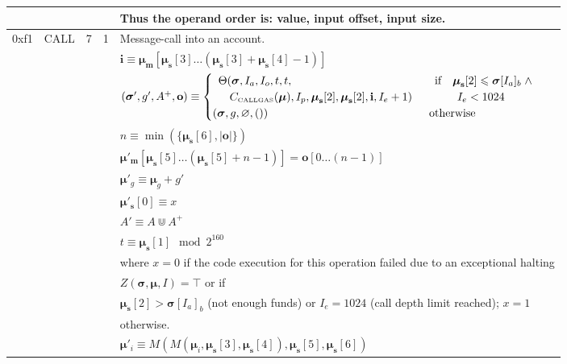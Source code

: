 \documentclass[9pt,oneside]{amsart}
\begin{document}
\begin{tabular*}{\columnwidth}[h]{rlrrl}
&&&& Thus the operand order is: value, input offset, input size. \\
\midrule
0xf1 & {\small CALL} & 7 & 1 & Message-call into an account. \\
&&&& $\mathbf{i} \equiv \boldsymbol{\mu}_\mathbf{m}[ \boldsymbol{\mu}_\mathbf{s}[3] \dots (\boldsymbol{\mu}_\mathbf{s}[3] + \boldsymbol{\mu}_\mathbf{s}[4] - 1) ]$ \\
&&&& $(\boldsymbol{\sigma}', g', A^+, \mathbf{o}) \equiv \begin{cases}\begin{array}{l}\Theta(\boldsymbol{\sigma}, I_a, I_o, t, t,\\ \quad C_{\text{\tiny CALLGAS}}(\boldsymbol{\mu}), I_p, \boldsymbol{\mu}_\mathbf{s}[2], \boldsymbol{\mu}_\mathbf{s}[2], \mathbf{i}, I_e + 1)\end{array} & \begin{array}{l}\text{if} \quad \boldsymbol{\mu}_\mathbf{s}[2] \leqslant \boldsymbol{\sigma}[I_a]_b \;\wedge \\ \quad\quad I_e < 1024\end{array}\\ (\boldsymbol{\sigma}, g, \varnothing, ()) & \text{otherwise} \end{cases}$ \\
&&&& $n \equiv \min(\{ \boldsymbol{\mu}_\mathbf{s}[6], |\mathbf{o}|\})$ \\
&&&& $\boldsymbol{\mu}'_\mathbf{m}[ \boldsymbol{\mu}_\mathbf{s}[5] \dots (\boldsymbol{\mu}_\mathbf{s}[5] + n - 1) ] = \mathbf{o}[0 \dots (n - 1)]$ \\
&&&& $\boldsymbol{\mu}'_g \equiv \boldsymbol{\mu}_g + g'$ \\
&&&& $\boldsymbol{\mu}'_\mathbf{s}[0] \equiv x$ \\
&&&& $A' \equiv A \Cup A^+$ \\
&&&& $t \equiv \boldsymbol{\mu}_\mathbf{s}[1] \mod 2^{160}$ \\
&&&& where $x=0$ if the code execution for this operation failed due to an exceptional halting \\
&&&& $Z(\boldsymbol{\sigma}, \boldsymbol{\mu}, I) = \top$ or if  \\
&&&& $\boldsymbol{\mu}_\mathbf{s}[2] > \boldsymbol{\sigma}[I_a]_b$ (not enough funds) or $I_e = 1024$ (call depth limit reached); $x=1$ \\
&&&& otherwise. \\
&&&& $\boldsymbol{\mu}'_i \equiv M(M(\boldsymbol{\mu}_i, \boldsymbol{\mu}_\mathbf{s}[3], \boldsymbol{\mu}_\mathbf{s}[4]), \boldsymbol{\mu}_\mathbf{s}[5], \boldsymbol{\mu}_\mathbf{s}[6])$ \\

\end{tabular*}
\end{document}
